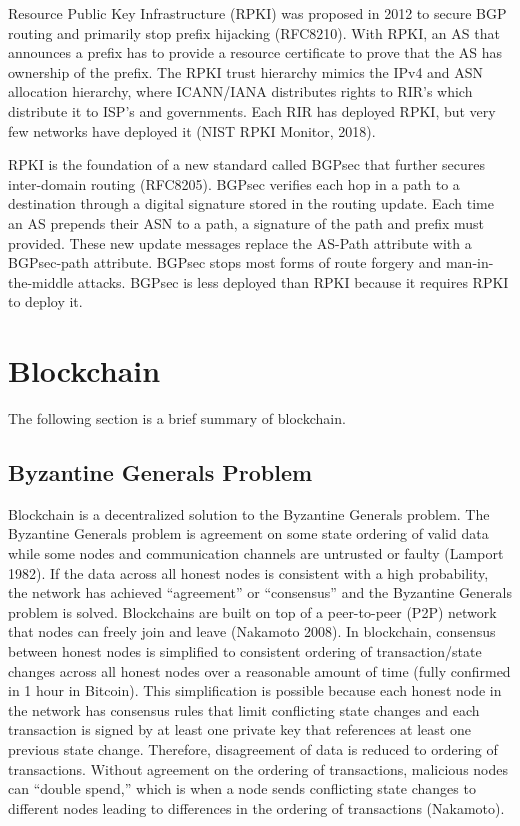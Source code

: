 \documentclass[letterpaper, 10 pt, conference]{ieeeconf}  %
\begin{document}
Resource Public Key Infrastructure (RPKI) was proposed in 2012 to secure BGP routing and primarily stop prefix hijacking (RFC8210). With RPKI, an AS that announces a prefix has to provide a resource certificate to prove that the AS has ownership of the prefix. The RPKI trust hierarchy mimics the IPv4 and ASN allocation hierarchy, where ICANN/IANA distributes rights to RIR’s which distribute it to ISP’s and governments. Each RIR has deployed RPKI, but very few networks have deployed it (NIST RPKI Monitor, 2018).

RPKI is the foundation of a new standard called BGPsec that further secures inter-domain routing (RFC8205). BGPsec verifies each hop in a path to a destination through a digital signature stored in the routing update. Each time an AS prepends their ASN to a path, a signature of the path and prefix must provided. These new update messages replace the AS-Path attribute with a BGPsec-path attribute. BGPsec stops most forms of route forgery and man-in-the-middle attacks. BGPsec is less deployed than RPKI because it requires RPKI to deploy it.


\section{Blockchain}
The following section is a brief summary of blockchain.

\subsection{Byzantine Generals Problem} 

Blockchain is a decentralized solution to the Byzantine Generals problem. The Byzantine Generals problem is agreement on some state ordering of valid data while some nodes and communication channels are untrusted or faulty (Lamport 1982). If the data across all honest nodes is consistent with a high probability, the network has achieved “agreement” or “consensus” and the Byzantine Generals problem is solved. Blockchains are built on top of a peer-to-peer (P2P) network that nodes can freely join and leave (Nakamoto 2008). In blockchain, consensus between honest nodes is simplified to consistent ordering of transaction/state changes across all honest nodes over a reasonable amount of time (fully confirmed in 1 hour in Bitcoin). This simplification is possible because each honest node in the network has consensus rules that limit conflicting state changes and each transaction is signed by at least one private key that references at least one previous state change. Therefore, disagreement of data is reduced to ordering of transactions. Without agreement on the ordering of transactions, malicious nodes can “double spend,” which is when a node sends conflicting state changes to different nodes leading to differences in the ordering of transactions (Nakamoto).
\end{document}
